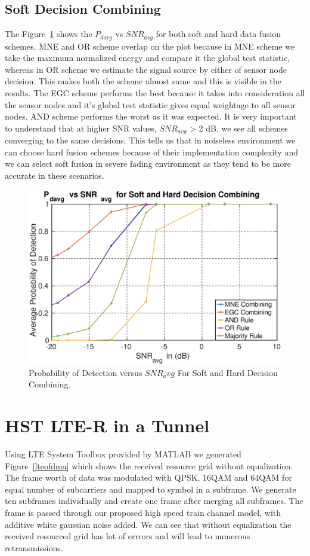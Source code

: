 \subsection{Soft Decision Combining}
The Figure~\ref{softpd} shows the $P_{davg}$ vs $SNR_{avg}$ for both soft and hard data fusion schemes. MNE and OR scheme overlap on the plot because in MNE scheme we take the maximum normalized energy and compare it the global test statistic, whereas in OR scheme we estimate the signal source by either of sensor node decision. This makes both the scheme almost same and this is visible in the results. The EGC scheme performs the best because it takes into consideration all the sensor nodes and it's global test statistic gives equal weightage to all sensor nodes. AND scheme performs the worst as it was expected. It is very important to understand that at higher SNR values, $SNR_{avg}$ > 2 dB, we see all schemes converging to the same decisions. This tells us that in noiseless environment we can choose hard fusion schemes because of their implementation complexity and we can select soft fusion in severe fading environment as they tend to be more accurate in these scenarios.
\begin{figure}[ht!]
	\centering
	\includegraphics[width=\textwidth,keepaspectratio]{images/Gill/figs/softnhardecisionpd.eps}
    \caption{Probability of Detection versus $SNR_avg$ For Soft and Hard Decision Combining.} 
\label{softpd}      
\end{figure}




\section{HST LTE-R in a Tunnel}
Using LTE System Toolbox provided by MATLAB we generated Figure~\ref{lteofdma} which shows the received resource grid without equalization. The frame worth of data was modulated with QPSK, 16QAM and 64QAM for equal number of subcarriers and mapped to symbol in a subframe. We generate ten subframes individually and create one frame after merging all subframes. The frame is passed through our proposed high speed train channel model, with additive white gaussian noise added. We can see that without equalization the received resourced grid has lot of errrors and will lead to numerous retransmissions.

